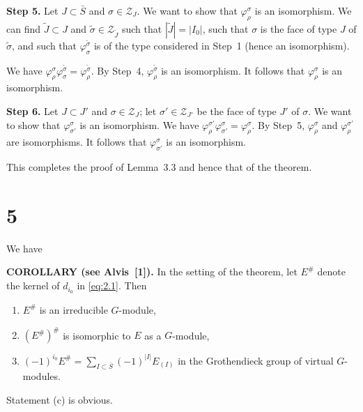 \documentclass[10pt,a4paper]{article}
\theoremstyle{plain}
\theoremstyle{definition}
\theoremstyle{remark}
\newcommand{\cZ}{\mathcal{Z}}
\begin{document}
\smallskip
\noindent\textbf{Step 5.} Let $J \subset \bar S$ and $\sigma \in \cZ_J$. We want to show that $\varphi_\rho^\sigma$ is an isomorphism. We can find $\widetilde J \subset J$ and $\widetilde\sigma \in \cZ_{\widetilde J}$ such that $|\widetilde J| = |I_0|$, such that $\sigma$ is the face of type $J$ of $\widetilde\sigma$, and such that $\varphi_\sigma^{\widetilde\sigma}$ is of the type considered in Step~1 (hence an isomorphism).

\newpage
\noindent We have $\varphi_\rho^\sigma\varphi_\sigma^{\widetilde\sigma}=\varphi_\rho^{\widetilde\sigma}$. By Step~4, $\varphi_\rho^{\widetilde\sigma}$ is an isomorphism. It follows that $\varphi_\rho^\sigma$ is an isomorphism.

\smallskip
\noindent\textbf{Step 6.} Let $J \subset J'$ and $\sigma \in \cZ_J$; let $\sigma' \in \cZ_{J'}$ be the face of type $J'$ of $\sigma$. We want to show that $\varphi_{\sigma'}^\sigma$ is an isomorphism. We have $\varphi_\rho^{\sigma'}\varphi_{\sigma'}^\sigma=\varphi_\rho^\sigma$. By Step~5, $\varphi_\rho^\sigma$ and $\varphi_\rho^{\sigma'}$ are isomorphisms. It follows that $\varphi_{\sigma'}^\sigma$ is an isomorphism.

This completes the proof of Lemma~3.3 and hence that of the theorem.

\section*{5}

We have

\medskip\noindent\textbf{COROLLARY (see Alvis~[1]).}\quad
In the setting of the theorem, let $E^\#$ denote the kernel of $d_{i_0}$ in \eqref{eq:2.1}. Then
\begin{enumerate}[label=(\alph*)]
\item $E^\#$ is an irreducible $G$-module,
\item $(E^\#)^\#$ is isomorphic to $E$ as a $G$-module,
\item $(-1)^{i_0} E^\# = \sum_{I \subset \bar S} (-1)^{|I|} E_{(I)}$ in the Grothendieck group of virtual $G$-modules.
\end{enumerate}

Statement (c) is obvious.
\end{document}
